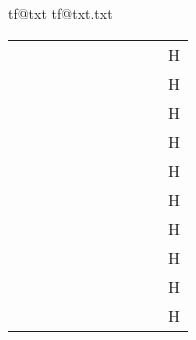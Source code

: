 \documentclass[12pt]{article}
\makeatletter
\def\outputm{
 \begingroup
    \makeatletter
    \if@filesw
      \expandafter\newwrite\csname tf@txt\endcsname
      \immediate\openout \csname tf@txt\endcsname \jobname.txt\relax
    \fi
    \@nobreakfalse
  \endgroup
}
\def\totxt#1{
\immediate\write\tf@txt{%
macro="\noexpand#1"\space package="bbding"}} \makeatother
\makeatother
\begin{document}
\outputm
\def\arraystretch{1}
\tabcolsep 0pt
\def\tabsep{\makebox{\hskip 20pt}}


\def\vvspace{\mbox{\hskip 10mm \fontsize{32}{34}\selectfont H}}



\def\K#1{#1\totxt{#1}}


\begin{tabular}{cccccccccc}
\tabsep &\tabsep &\tabsep &\tabsep &\tabsep &\tabsep &\tabsep &\tabsep &\tabsep &\vvspace \\
\K\ArrowBoldDownRight
&\K\ArrowBoldRightShort
&\K\ArrowBoldUpRight
&\K\ArrowBoldRightCircled
&\K\ArrowBoldRightStrobe
&\K\ScissorHollowLeft
&\K\ScissorLeftBrokenTop
&\K\ScissorHollowRight
&\K\ScissorRight                &\vvspace \\
\K\ScissorLeft
&\K\ScissorRightBrokenBottom
&\K\ScissorLeftBrokenBottom
&\K\ScissorRightBrokenTop
&\K\NibLeft
&\K\PencilLeft
&\K\PencilRightDown
&\K\NibRight
&\K\PencilLeftDown                  &\vvspace \\
\K\PencilRightUp
&\K\NibSolidLeft
&\K\PencilLeftUp
&\K\NibSolidRight
&\K\PencilRight
&\K\HandCuffLeft
&\K\HandCuffRightUp
&\K\HandPencilLeft
&\K\HandCuffLeftUp              &\vvspace \\
\K\HandLeft
&\K\HandRight
&\K\HandCuffRight
&\K\HandLeftUp
&\K\HandRightUp
&\K\Cross
&\K\CrossOpenShadow
&\K\PlusOutline
&\K\CrossBoldOutline       &\vvspace \\
\K\CrossOutline
&\K\PlusThinCenterOpen
&\K\CrossClowerTips
&\K\Plus
&\K\CrossMaltese
&\K\PlusCenterOpen
&\K\Checkmark
&\K\XSolid
&\K\XSolidBrush        &\vvspace \\
\K\CheckmarkBold
&\K\XSolidBold
&\K\Asterisk
&\K\FiveFlowerPetal
&\K\JackStar
&\K\AsteriskBold
&\K\FiveStar
&\K\JackStarBold
&\K\AsteriskCenterOpen      &\vvspace \\
\K\FiveStarCenterOpen
&\K\SixFlowerAlternate
&\K\AsteriskRoundedEnds
&\K\FiveStarConvex
&\K\SixFlowerAltPetal
&\K\AsteriskThin
&\K\FiveStarLines
&\K\SixFlowerOpenCenter
&\K\AsteriskThinCenterOpen       &\vvspace \\
\K\FiveStarOpen
&\K\SixFlowerPetalDotted
&\K\DavidStar
&\K\FiveStarOpenCircled
&\K\SixFlowerPetalRemoved
&\K\DavidStarSolid
&\K\FiveStarOpenDotted
&\K\SixFlowerRemovedOpenPetal
&\K\EightAsterisk                 &\vvspace \\
\K\FiveStarOutline
&\K\SixStar
&\K\EightFlowerPetal
&\K\FiveStarOutlineHeavy
&\K\SixteenStarLight
&\K\EightFlowerPetalRemoved
&\K\FiveStarShadow
&\K\Snowflake
&\K\EightStar                    &\vvspace \\

\end{tabular}
\end{document}
